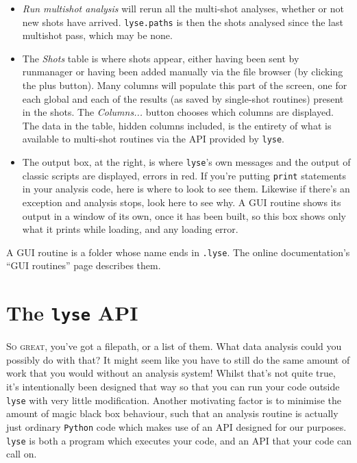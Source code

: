 \documentclass[a4paper,11pt,titlepage]{article}
\begin{document}
\begin{itemize}
\item \emph{Run multishot analysis} will rerun all the multi-shot analyses, whether or not new shots have arrived. \texttt{lyse.paths} is then the shots analysed since the last multishot pass, which may be none.

\item The \emph{Shots} table is where shots appear, either having been sent by runmanager or having been added manually via the file browser (by clicking the plus button). Many columns will populate this part of the screen, one for each global and each of the results (as saved by single-shot routines) present in the shots. The \emph{Columns...} button chooses which columns are displayed. The data in the table, hidden columns included, is the entirety of what is available to multi-shot routines via the API provided by \texttt{lyse}.

\item The output box, at the right, is where \texttt{lyse}'s own messages and the output of classic scripts are displayed, errors in red. If you're putting \texttt{print} statements in your analysis code, here is where to look to see them. Likewise if there's an exception and analysis stops, look here to see why. A GUI routine shows its output in a window of its own, once it has been built, so this box shows only what it prints while loading, and any loading error.
\end{itemize}

A GUI routine is a folder whose name ends in \texttt{.lyse}. The online documentation's ``GUI routines'' page describes them.

\section{The \texttt{lyse} API}
\lettrine[lines=3]{S}{o great,}  you've got a filepath, or a list of them. What data analysis could you possibly do with that? It might seem like you have to still do the same amount of work that you would without an analysis system! Whilst that's not quite true, it's intentionally been designed that way so that you can run your code outside \texttt{lyse} with very little modification. Another motivating factor is to minimise the amount of magic black box behaviour, such that an analysis routine is actually just ordinary \texttt{Python} code which makes use of an API designed for our purposes. \texttt{lyse} is both a program which executes your code, and an API that your code can call on.
\end{document}

